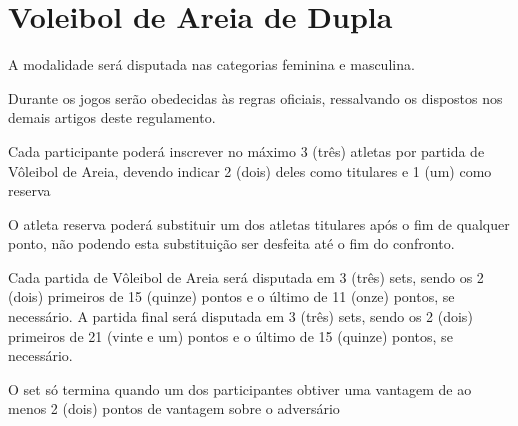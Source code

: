 {\let\clearpage\relax \chapter{Voleibol de Areia de Dupla}}

\begin{article}
	A modalidade será disputada nas categorias feminina e masculina.
\end{article}

\begin{article}
	Durante os jogos serão obedecidas às regras oficiais, ressalvando os dispostos nos demais artigos deste regulamento.
\end{article}

\begin{article}
	Cada participante poderá inscrever no máximo 3 (três) atletas por partida de Vôleibol de Areia, devendo indicar 2 (dois) deles como titulares e 1 (um) como reserva

	\begin{xparagraph}
		O atleta reserva poderá substituir um dos atletas titulares após o fim de qualquer ponto, não podendo esta substituição ser desfeita até o fim do confronto.
	\end{xparagraph}
\end{article}

\begin{article}
	Cada partida de Vôleibol de Areia será disputada em 3 (três) sets, sendo os 2 (dois) primeiros de 15 (quinze) pontos e o último de 11 (onze) pontos, se necessário. A partida final será disputada em 3 (três) sets, sendo os 2 (dois) primeiros de 21 (vinte e um) pontos e o último de 15 (quinze) pontos, se necessário.

	\begin{xparagraph}
		O set só termina quando um dos participantes obtiver uma vantagem de ao menos 2 (dois) pontos de vantagem sobre o adversário
	\end{xparagraph}
\end{article}
